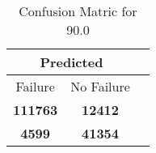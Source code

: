 \begin{table}[] 
\caption{Confusion Matric for 90.0} 
\label{Table: Prediction Accuracy-DMD90.0OnlySunEKF-resetReflection-Reflection} 
\centering 
\begin{tabular} 
 {@{}ccc@{}} 
\toprule 
\multicolumn{2}{c}{\textbf{Predicted}}
 \\ \midrule 
\multicolumn{1}{|c|}{Failure} & 
\multicolumn{1}{c|}{No Failure}
 \\ \midrule 
\multicolumn{1}{|c|}{\color{green}\textbf{111763}} & 
\multicolumn{1}{c|}{\color{red}\textbf{12412}}
 \\ \midrule 
\multicolumn{1}{|c|}{\color{red}\textbf{4599}} & 
\multicolumn{1}{c|}{\color{green}\textbf{41354}}
 \\ \bottomrule 
\end{tabular} 
\end{table} 
